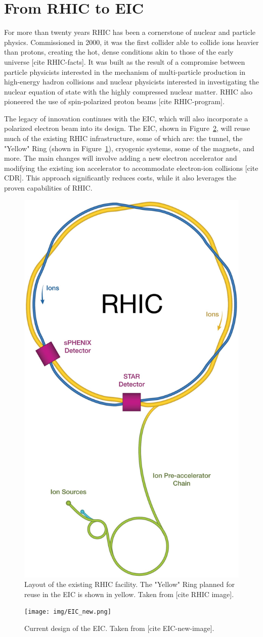 \section{From RHIC to EIC}
For more than twenty years RHIC has been a cornerstone of nuclear and particle physics. Commissioned in 2000, it was the first collider able to collide ions heavier than protons, creating the hot, dense conditions akin to those of the early universe [cite RHIC-facts]. It was built as the result of a compromise between particle physicists interested in the mechanism of multi-particle production in high-energy hadron collisions and nuclear physicists interested in investigating the nuclear equation of state with the highly compressed nuclear matter. RHIC also pioneered the use of spin-polarized proton beams [cite RHIC-program].

The legacy of innovation continues with the EIC, which will also incorporate a polarized electron beam into its design. The EIC, shown in Figure~\ref{fig:eic:eic}, will reuse much of the existing RHIC infrastructure, some of which are: the tunnel, the "Yellow" Ring (shown in Figure~\ref{fig:eic:rhic}), cryogenic systems, some of the magnets, and more. The main changes will involve adding a new electron accelerator and modifying the existing ion accelerator to accommodate electron-ion collisions [cite CDR]. This approach significantly reduces costs, while it also leverages the proven capabilities of RHIC.

\begin{figure}[ht]
    \centering
    \includegraphics[width=.3\linewidth]{img/rhic.jpg}
    \caption{Layout of the existing RHIC facility. The "Yellow" Ring planned for reuse in the EIC is shown in yellow. Taken from [cite RHIC image].}
    \label{fig:eic:rhic}
\end{figure}

\begin{figure}[ht]
    \centering
    \texttt{[image: img/EIC\_new.png]}
    \caption{Current design of the EIC. Taken from [cite EIC-new-image].}
    \label{fig:eic:eic}
\end{figure}

